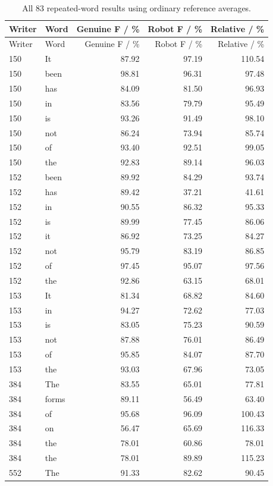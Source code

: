 \begin{longtable}{llrrr}
\caption{All 83 repeated-word results using ordinary reference averages.}\label{tab:app-geometric-words}\\
\toprule Writer & Word & Genuine F / \% & Robot F / \% & Relative / \%\\\midrule
\endfirsthead
\toprule Writer & Word & Genuine F / \% & Robot F / \% & Relative / \%\\\midrule\endhead
150 & It & 87.92 & 97.19 & 110.54\\
150 & been & 98.81 & 96.31 & 97.48\\
150 & has & 84.09 & 81.50 & 96.93\\
150 & in & 83.56 & 79.79 & 95.49\\
150 & is & 93.26 & 91.49 & 98.10\\
150 & not & 86.24 & 73.94 & 85.74\\
150 & of & 93.40 & 92.51 & 99.05\\
150 & the & 92.83 & 89.14 & 96.03\\
152 & been & 89.92 & 84.29 & 93.74\\
152 & has & 89.42 & 37.21 & 41.61\\
152 & in & 90.55 & 86.32 & 95.33\\
152 & is & 89.99 & 77.45 & 86.06\\
152 & it & 86.92 & 73.25 & 84.27\\
152 & not & 95.79 & 83.19 & 86.85\\
152 & of & 97.45 & 95.07 & 97.56\\
152 & the & 92.86 & 63.15 & 68.01\\
153 & It & 81.34 & 68.82 & 84.60\\
153 & in & 94.27 & 72.62 & 77.03\\
153 & is & 83.05 & 75.23 & 90.59\\
153 & not & 87.88 & 76.01 & 86.49\\
153 & of & 95.85 & 84.07 & 87.70\\
153 & the & 93.03 & 67.96 & 73.05\\
384 & The & 83.55 & 65.01 & 77.81\\
384 & forms & 89.11 & 56.49 & 63.40\\
384 & of & 95.68 & 96.09 & 100.43\\
384 & on & 56.47 & 65.69 & 116.33\\
384 & the & 78.01 & 60.86 & 78.01\\
384 & the & 78.01 & 89.89 & 115.23\\
552 & The & 91.33 & 82.62 & 90.45\\

\end{longtable}
